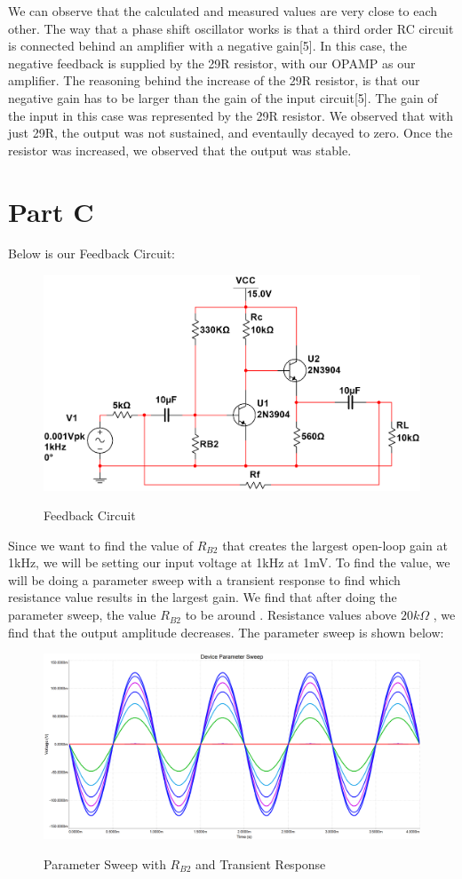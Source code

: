 \documentclass[12pt]{article}
\begin{document}
We can observe that the calculated and measured values are very close to each other. The way that a phase shift oscillator
works is that a third order RC circuit is connected behind an amplifier with a negative gain[5]. In this case, the negative feedback
is supplied by the 29R resistor, with our OPAMP as our amplifier. The reasoning behind the increase of the 29R resistor, is that our negative gain
has to be larger than the gain of the input circuit[5]. The gain of the input in this case was represented by the 29R resistor.
We observed that with just 29R, the output was not sustained, and eventaully decayed to zero. Once the resistor was increased,
we observed that the output was stable. 

\section{Part C}
Below is our Feedback Circuit:
\begin{figure}[H]
    \centering
    \includegraphics[height=0.35\textwidth]{Images/partCcircuit.png}\\
    \caption{Feedback Circuit}
    \label{fig:feedbackcircuit}
\end{figure}

Since we want to find the value of $R_{B2}$ that creates the largest open-loop gain at 1kHz, we will be setting our
input voltage at 1kHz at 1mV. To find the value, we will be doing a parameter sweep with a transient response to 
find which resistance value results in the largest gain. We find that after doing the parameter sweep,
the value $R_{B2}$ to be around . Resistance values above $20k\Omega$
, we find that the output amplitude decreases. The parameter sweep is shown below:

\begin{figure}[h!]
    \centering
    \includegraphics[height=0.45\textwidth]{Images/parametersweep.png}\\
    \caption{Parameter Sweep with $R_{B2}$ and Transient Response}
    \label{fig:parametersweep}
\end{figure}
\FloatBarrier
\end{document}
